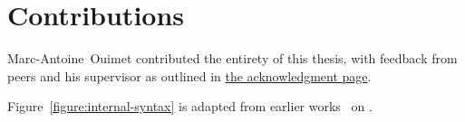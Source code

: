 \chapter*{Contributions}

Marc-Antoine~Ouimet contributed the entirety of this thesis, with feedback from peers and his supervisor as outlined in \hyperref[chapter:acknowledgments]{the acknowledgment page}.

Figure~\ref{figure:internal-syntax} is adapted from earlier works~\cite{nanevski2008contextual, germain2010implementation, cave2013first, ferreira2013compiling} on \Beluga.
